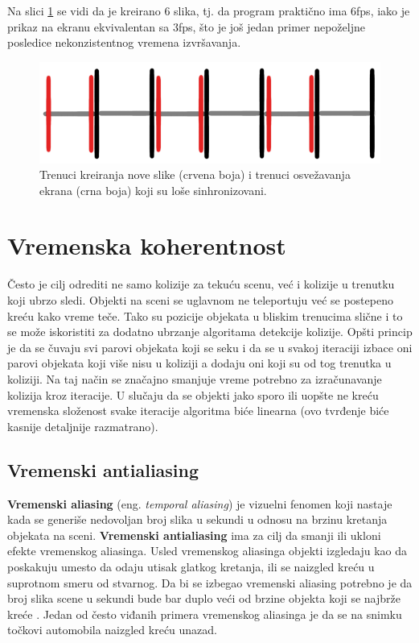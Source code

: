 \documentclass[12pt,oneside]{memoir}
\begin{document}
Na slici \ref{fig:fpsdiv2} se vidi da je kreirano 6 slika, tj. da program praktično ima 6fps, iako je prikaz na ekranu 
ekvivalentan sa 3fps, što je još jedan primer nepoželjne posledice nekonzistentnog vremena izvršavanja. 

\begin{figure}[h!]
	\centering
	\includegraphics[scale=0.5]{fpsdiv2.png}
	\caption{ Trenuci kreiranja nove slike (crvena boja) i trenuci osvežavanja ekrana (crna boja) koji su loše sinhronizovani. }
	\label{fig:fpsdiv2}
\end{figure}

\section{Vremenska koherentnost}

Često je cilj odrediti ne samo kolizije za tekuću scenu, već i kolizije u trenutku koji ubrzo sledi.
Objekti na sceni se uglavnom ne teleportuju već se postepeno kreću kako vreme teče.
Tako su pozicije objekata u bliskim trenucima slične i to se može iskoristiti za dodatno ubrzanje algoritama detekcije kolizije. 
Opšti princip je da se čuvaju svi parovi objekata koji se seku i da se u svakoj iteraciji 
izbace oni parovi objekata koji više nisu u koliziji a dodaju oni koji su od tog trenutka u koliziji.
Na taj način se značajno smanjuje vreme potrebno za izračunavanje kolizija kroz iteracije.
U slučaju da se objekti jako sporo ili uopšte ne kreću 
vremenska složenost svake iteracije algoritma biće linearna (ovo tvrđenje biće kasnije detaljnije razmatrano).


\subsection{Vremenski antialiasing}

\textbf{Vremenski aliasing} (eng. {\em temporal aliasing}) je vizuelni fenomen koji 
nastaje kada se generiše nedovoljan broj slika u sekundi u odnosu na brzinu kretanja objekata na sceni.
\textbf{Vremenski antialiasing} ima za cilj da smanji ili ukloni efekte vremenskog aliasinga.
Usled vremenskog aliasinga objekti izgledaju kao da poskakuju umesto da odaju utisak glatkog kretanja,
ili se naizgled kreću u suprotnom smeru od stvarnog.
Da bi se izbegao vremenski aliasing potrebno je da broj slika scene u sekundi bude bar duplo veći 
od brzine objekta koji se najbrže kreće \cite{Grant}. 
Jedan od često viđanih primera vremenskog aliasinga je da se na snimku točkovi automobila naizgled kreću unazad.
\end{document}

